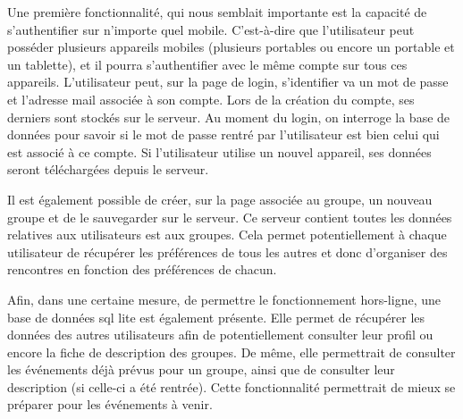 Une première fonctionnalité, qui nous semblait importante est la capacité de s'authentifier sur n'importe quel mobile. C'est-à-dire
que l'utilisateur peut posséder  plusieurs appareils mobiles (plusieurs portables ou encore un portable et un tablette), et il
pourra s'authentifier avec le même compte sur tous ces appareils. L'utilisateur peut, sur la page de login, s'identifier va un
mot de passe et l'adresse mail associée à son compte. Lors de la création du compte, ses derniers sont stockés sur le serveur.
Au moment du login, on interroge la base de données pour savoir si le mot de passe rentré par l'utilisateur est bien celui qui est
associé à ce compte. Si l'utilisateur utilise un nouvel appareil, ses données seront téléchargées depuis le serveur.
\newline

Il est également possible de créer, sur la page associée au groupe, un nouveau groupe et de le sauvegarder sur le serveur. Ce
serveur contient toutes les données relatives aux utilisateurs est aux groupes. Cela permet potentiellement à chaque utilisateur
de récupérer les préférences de tous les autres et donc d'organiser des rencontres en fonction des préférences de chacun.
\newline

Afin, dans une certaine mesure, de permettre le fonctionnement hors-ligne, une base de données sql lite est également présente.
Elle permet de récupérer les données des autres utilisateurs afin de potentiellement consulter leur profil ou encore la fiche de
description des groupes. De même, elle permettrait de consulter les événements déjà prévus pour un groupe, ainsi que de consulter
leur description (si celle-ci a été rentrée). Cette fonctionnalité permettrait de mieux se préparer pour les événements à venir.
\newline

